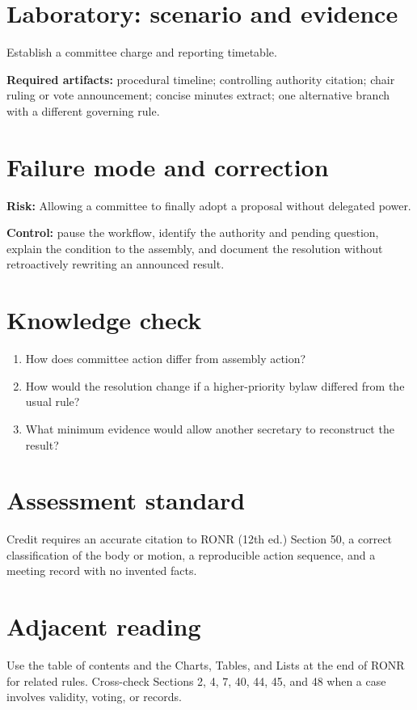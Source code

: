 \documentclass[11pt]{article}
\begin{document}
\section{Laboratory: scenario and evidence}
Establish a committee charge and reporting timetable.

\textbf{Required artifacts:} procedural timeline; controlling authority citation; chair ruling or vote announcement; concise minutes extract; one alternative branch with a different governing rule.

\section{Failure mode and correction}
\textbf{Risk:} Allowing a committee to finally adopt a proposal without delegated power.

\textbf{Control:} pause the workflow, identify the authority and pending question, explain the condition to the assembly, and document the resolution without retroactively rewriting an announced result.

\section{Knowledge check}
\begin{enumerate}[leftmargin=*,itemsep=4pt]
\item How does committee action differ from assembly action?
\item How would the resolution change if a higher-priority bylaw differed from the usual rule?
\item What minimum evidence would allow another secretary to reconstruct the result?
\end{enumerate}

\section{Assessment standard}
Credit requires an accurate citation to RONR (12th ed.) Section 50, a correct classification of the body or motion, a reproducible action sequence, and a meeting record with no invented facts.

\section{Adjacent reading}
Use the table of contents and the Charts, Tables, and Lists at the end of RONR for related rules. Cross-check Sections 2, 4, 7, 40, 44, 45, and 48 when a case involves validity, voting, or records.
\end{document}
